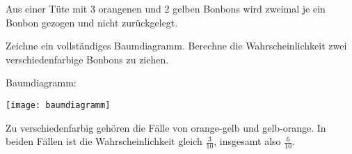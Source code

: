 \documentclass[a4paper,12pt]{article}
\begin{document}
\question[5]%
	Aus einer Tüte mit 
	3 orangenen und 2 gelben Bonbons
	wird zweimal je ein Bonbon gezogen und nicht zurückgelegt.
\begin{subparts}
	\subpart Zeichne ein vollständiges Baumdiagramm.
%
	\subpart Berechne die Wahrscheinlichkeit zwei verschiedenfarbige Bonbons zu ziehen.
\end{subparts}

\begin{solution}
\begin{subparts}
	\subpart Baumdiagramm:

	\texttt{[image: baumdiagramm]}

	\subpart Zu verschiedenfarbig gehören die Fälle von orange-gelb und gelb-orange. In beiden Fällen ist die Wahrscheinlichkeit gleich $\frac{3}{10}$, insgesamt also $\frac{6}{10}$.
\end{subparts}
\end{solution}
\end{document}
